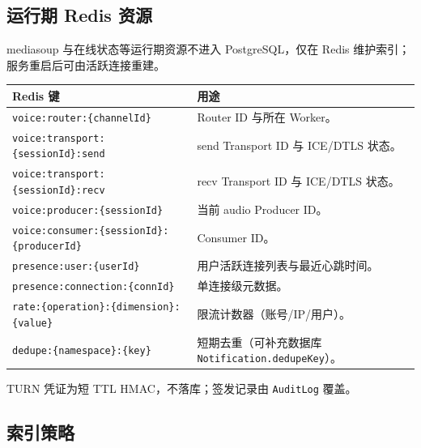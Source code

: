 \subsection{运行期 Redis 资源}

mediasoup 与在线状态等运行期资源不进入 PostgreSQL，仅在 Redis 维护索引；服务重启后可由活跃连接重建。

\noindent\begin{tabularx}{\textwidth}{L{6.4cm}Y}
  \toprule
  Redis 键 & 用途 \\
  \midrule
  \texttt{voice:router:\{channelId\}} & Router ID 与所在 Worker。 \\
  \texttt{voice:transport:\{sessionId\}:send} & send Transport ID 与 ICE/DTLS 状态。 \\
  \texttt{voice:transport:\{sessionId\}:recv} & recv Transport ID 与 ICE/DTLS 状态。 \\
  \texttt{voice:producer:\{sessionId\}} & 当前 audio Producer ID。 \\
  \texttt{voice:consumer:\{sessionId\}:\{producerId\}} & Consumer ID。 \\
  \texttt{presence:user:\{userId\}} & 用户活跃连接列表与最近心跳时间。 \\
  \texttt{presence:connection:\{connId\}} & 单连接级元数据。 \\
  \texttt{rate:\{operation\}:\{dimension\}:\{value\}} & 限流计数器（账号/IP/用户）。 \\
  \texttt{dedupe:\{namespace\}:\{key\}} & 短期去重（可补充数据库 \texttt{Notification.dedupeKey}）。 \\
  \bottomrule
\end{tabularx}

TURN 凭证为短 TTL HMAC，不落库；签发记录由 \texttt{AuditLog} 覆盖。

\subsection{索引策略}

